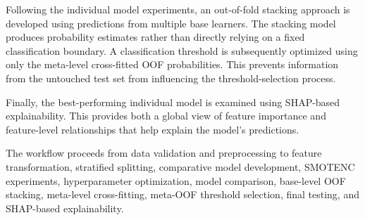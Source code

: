 \documentclass[conference]{IEEEtran}
\begin{document}
Following the individual model experiments, an out-of-fold stacking approach is developed using predictions from multiple base learners. The stacking model produces probability estimates rather than directly relying on a fixed classification boundary. A classification threshold is subsequently optimized using only the meta-level cross-fitted OOF probabilities. This prevents information from the untouched test set from influencing the threshold-selection process.

Finally, the best-performing individual model is examined using SHAP-based explainability. This provides both a global view of feature importance and feature-level relationships that help explain the model's predictions.

The workflow proceeds from data validation and preprocessing to feature transformation, stratified splitting, comparative model development, SMOTENC experiments, hyperparameter optimization, model comparison, base-level OOF stacking, meta-level cross-fitting, meta-OOF threshold selection, final testing, and SHAP-based explainability.
\end{document}
